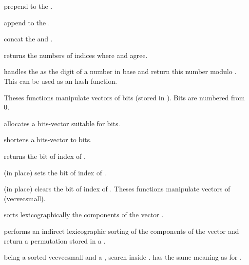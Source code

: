  prepend  to the  .

 append  to the  .

 concat the   and .

 returns the numbers of indices where  and  agree.

 handles the
  as the digit of a number in base  and return
this number modulo . This can be used as an hash function.

Theses functions manipulate vectors of bits (stored in ).
Bits are numbered from 0.

 allocates a bits-vector suitable for 
bits.

 shortens a bits-vector
 to  bits.

 returns the bit of index  of
.

 (in place) sets the bit of index
 of .

 (in place) clears the bit of index  of .
Theses functions manipulate vectors of  (vecvecsmall).

 sorts lexicographically the components of
the vector .

 performs an indirect lexicographic sorting of the components of the vector  and return a permutation stored in a .

  being a sorted
vecvecsmall and  a , search  inside .  has the same meaning as for .

\vfill\eject
